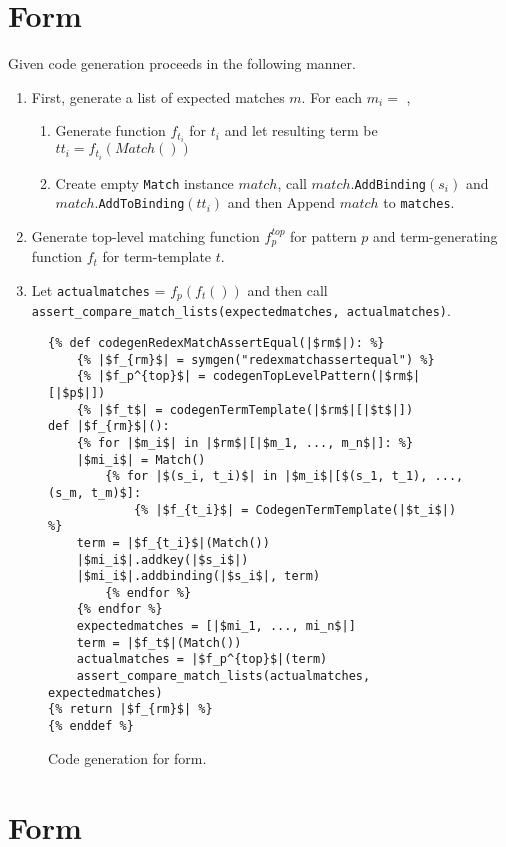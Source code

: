 \section{\RedexMatchAssertEqualNoArgs \space Form}
Given \RedexMatchAssertEqual code generation proceeds in the following manner.

\begin{enumerate}
\item First, generate a list of expected matches $m$. For each $m_i =$ \Match,
\begin{enumerate}
\item Generate function $f_{t_i}$ for $t_i$ and let resulting term be $tt_i = f_{t_i}(Match())$
\item Create empty \texttt{Match} instance $match$, call $match$.\texttt{AddBinding}$(s_i)$ and $match$.\texttt{AddToBinding}$(tt_i)$ and then Append $match$ to \texttt{matches}.
\end{enumerate}
\item Generate top-level matching function $f_p^{top}$ for pattern $p$ and term-generating function $f_t$ for term-template $t$.
\item Let \texttt{actualmatches} = $f_p(f_t())$ and then call \texttt{assert\_compare\_match\_lists(expectedmatches, actualmatches)}.
\end{enumerate}

\begin{figure}[h]
\begin{verbatim}
{% def codegenRedexMatchAssertEqual(|$rm$|): %}
	{% |$f_{rm}$| = symgen("redexmatchassertequal") %}
	{% |$f_p^{top}$| = codegenTopLevelPattern(|$rm$|[|$p$|])
	{% |$f_t$| = codegenTermTemplate(|$rm$|[|$t$|])
def |$f_{rm}$|():
	{% for |$m_i$| in |$rm$|[|$m_1, ..., m_n$|]: %}
	|$mi_i$| = Match()
		{% for |$(s_i, t_i)$| in |$m_i$|[$(s_1, t_1), ..., (s_m, t_m)$]:
			{% |$f_{t_i}$| = CodegenTermTemplate(|$t_i$|) %}
	term = |$f_{t_i}$|(Match())
	|$mi_i$|.addkey(|$s_i$|)
	|$mi_i$|.addbinding(|$s_i$|, term)
		{% endfor %}
	{% endfor %}
	expectedmatches = [|$mi_1, ..., mi_n$|]
	term = |$f_t$|(Match())
	actualmatches = |$f_p^{top}$|(term)
	assert_compare_match_lists(actualmatches, expectedmatches)
{% return |$f_{rm}$| %}
{% enddef %}
\end{verbatim}
\caption{Code generation for \RedexMatchAssertEqualNoArgs \space form.}
\label{codegen-redexmatch}
\end{figure}

\section{\TermLetAssertEqualNoArgs \space Form}

